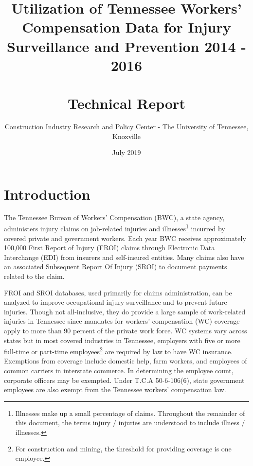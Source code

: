 \documentclass[9pt, oneside]{article}   	%
\title{Utilization of Tennessee Workers' Compensation Data for Injury Surveillance and Prevention 2014 - 2016\\
\hspace{0.5in}\\
\large Technical Report}
\author{Construction Industry Research and Policy Center - The University of Tennessee, Knoxville}
\date{July 2019}							%
\begin{document}
\maketitle

\pagebreak

\tableofcontents 		%

\pagebreak

\listoftables			%

\pagebreak

\listoffigures

\pagebreak


\section{Introduction}

The Tennessee Bureau of Workers' Compensation (BWC), a state agency, administers injury claims on job-related injuries and illnesses\footnote{Illnesses make up a small percentage of claims. Throughout the remainder of this document, the terms injury / injuries are understood to include illness / illnesses.} incurred by covered private and government workers. Each year BWC receives approximately 100,000 First Report of Injury (FROI) claims through Electronic Data Interchange (EDI) from insurers and self-insured entities. Many claims also have an associated Subsequent Report Of Injury (SROI) to document  payments related to the claim. 

FROI and SROI databases, used primarily for claims administration, can be analyzed to improve occupational injury surveillance and to prevent future injuries. Though not all-inclusive, they do provide a large sample of work-related injuries in Tennessee since mandates for workers' compensation (WC) coverage apply to more than 90 percent of the private work force. WC systems vary across states but in most covered industries in Tennessee, employers with five or more full-time or part-time employees\footnote{For construction and mining, the threshold for providing coverage is one employee.} are required by law to have WC insurance.  Exemptions from coverage include domestic help, farm workers, and employees of common carriers in interstate commerce. In determining the employee count, corporate officers may be exempted. Under T.C.A 50-6-106(6), state government employees are also exempt from the Tennessee workers' compensation law.
\end{document}
